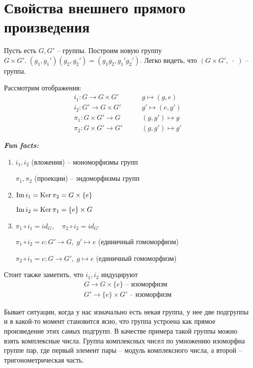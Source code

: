 \section{Свойства внешнего прямого произведения}
Пусть есть $G, G'$ -- группы. Построим новую группу 
$G \times G'. \; (g_1, g_1')(g_2, g_2') = (g_1g_2, g_1'g_2')$. Легко видеть, 
что $(G \times G', \; \cdot \; )$ -- группа. 

\begin{theorem-non} 
    Рассмотрим отображения: 
    \begin{align*}
        i_1: G \longrightarrow G \times G' &\qquad g \longmapsto (g, e) \\
        i_2: G' \longrightarrow G \times G' &\qquad g' \longmapsto (e, g') \\
        \pi_1: G \times G' \longrightarrow G &\qquad (g, g') \longmapsto g \\
        \pi_2: G \times G' \longrightarrow G' &\qquad (g, g') \longmapsto g'
    \end{align*}
\end{theorem-non}
\textbf{\textit{Fun facts: }}
\begin{enumerate}
    \item $i_1, i_2$ (вложения) -- мономорфизмы групп
    
    $\pi_1, \pi_2$ (проекции) -- эндоморфизмы групп
    \item $\operatorname{Im}{i_1} = \operatorname{Ker}{\pi_2} = G \times \{e\}$
    
    $\operatorname{Im}{i_2} = \operatorname{Ker}{\pi_1} = \{e\} \times G$
    \item $\pi_1 \circ i_1 = id_G, \quad \pi_2 \circ i_2 = id_{G'}$
    
    $\pi_1 \circ i_2 = e: G' \longrightarrow G, \; g' \longmapsto e$ (единичный гомоморфизм)

    $\pi_2 \circ i_1 = e: G \longrightarrow G', \; g \longmapsto e$ (единичный гомоморфизм)
\end{enumerate}

Стоит также заметить, что $i_1, i_2$ индуцируют 
\begin{gather*}
    G \longrightarrow G \times \{e\} \text{ -- изоморфизм} \\
    G' \longrightarrow \{e\} \times G' \text{ -- изоморфизм}
\end{gather*}

Бывает ситуации, когда у нас изначально есть некая группа, у нее две подгруппы и в какой-то момент становится 
ясно, что группа устроена как прямое произведение этих самых подгрупп. В качестве примера такой группы можно взять 
комплексные числа. Группа комплексных чисел по умножению изоморфна группе пар, где первый элемент пары -- 
модуль комплексного числа, а второй -- тригонометрическая часть. 
